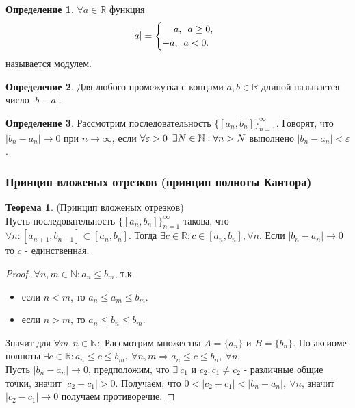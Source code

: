 \documentclass[a4paper, 12pt]{article}
\newcommand{\N}{\mathbb{N}}
\newcommand{\R}{\mathbb{R}}
\renewcommand{\epsilon}{\varepsilon}
\newcommand\tab[1][.5cm]{\hspace*{#1}}
\theoremstyle{definition}
\newtheorem*{definition}{Определение}
\newtheorem*{theorem}{Теорема}
\begin{document}
        \begin{definition}
            $\forall a\in \R$ функция
            \[|a|=
                \begin{cases}
                    \tab[12pt]a, \tab[5pt] a\geq 0,\\
                    -a, \tab[5pt] a<0.
                \end{cases}\]
            называется модулем.
        \end{definition}
        \begin{definition}
            Для любого промежутка с концами $a,b\in \R$ длиной называется число $|b-a|$.
        \end{definition}
        \begin{definition}
            Рассмотрим последовательность $\{[a_n,b_n]\}_{n=1}^{\infty}$. Говорят, что\\ $|b_n-a_n|\to 0$ при $n\to \infty$, если $\forall \epsilon >0\tab[5pt]\exists N\in \N: \forall n>N$ выполнено $|b_n-a_n|<\epsilon$.
        \end{definition}
        \subsubsection{Принцип вложеных отрезков (принцип полноты Кантора)}
        \begin{theorem} (Принцип вложеных отрезков) \\
            Пусть последовательность $\{[a_n,b_n]\}_{n=1}^{\infty}$ такова, что $\forall n: [a_{n+1},b_{n+1}]\subset [a_n,b_n]$. Тогда $\exists c\in \R: c\in [a_n,b_n], \forall n$. Если $|b_n-a_n|\to 0$ то $c$ - единственная.
        \end{theorem} 
        \begin{proof}
            $\forall n,m\in \N: a_n\leq b_m$, т.к
            \begin{itemize}
                \item если $n<m$, то $a_n\leq a_m\leq b_m$.
                \item если $n>m$, то $a_n\leq b_n\leq b_m$.
            \end{itemize}
            Значит для $\forall m,n\in \N: $
            Рассмотрим множества $A=\{a_n\}$ и $B=\{b_n\}$. По аксиоме полноты $\exists c\in \R: a_n\leq c\leq b_m,\ \forall n,m \Rightarrow a_n\leq c\leq b_n,\ \forall n$.\\
            Пусть $|b_n-a_n|\to 0$, предположим, что $\exists\ c_1$ и $c_2: c_1\ne c_2$ - различные общие точки, значит $|c_2-c_1|>0$. Получаем, что $0<|c_2-c_1|<|b_n-a_n|,\ \forall n$, значит $|c_2-c_1|\to 0$ получаем противоречие.
        \end{proof}
\end{document}
